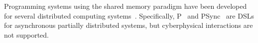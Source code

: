 
%
Programming systems using the  shared memory paradigm have been developed for several distributed computing systems~\cite{dsm1991,Adve96sharedmemory,Azure,Cassandra,Dynamo}.
Specifically, P~\cite{Planguage}  and PSync~\cite{PSyncLanguage} are DSLs for  asynchronous partially  distributed systems, but cyberphysical interactions are not supported. 


%

%
%

